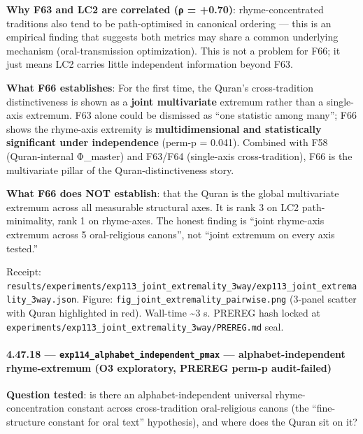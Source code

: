\documentclass[
]{article}
\begin{document}
\textbf{Why F63 and LC2 are correlated (ρ = +0.70)}: rhyme-concentrated
traditions also tend to be path-optimised in canonical ordering --- this
is an empirical finding that suggests both metrics may share a common
underlying mechanism (oral-transmission optimization). This is not a
problem for F66; it just means LC2 carries little independent
information beyond F63.

\textbf{What F66 establishes}: For the first time, the Quran's
cross-tradition distinctiveness is shown as a \textbf{joint
multivariate} extremum rather than a single-axis extremum. F63 alone
could be dismissed as ``one statistic among many''; F66 shows the
rhyme-axis extremity is \textbf{multidimensional and statistically
significant under independence} (perm-p = 0.041). Combined with F58
(Quran-internal Φ\_master) and F63/F64 (single-axis cross-tradition),
F66 is the multivariate pillar of the Quran-distinctiveness story.

\textbf{What F66 does NOT establish}: that the Quran is the global
multivariate extremum across all measurable structural axes. It is rank
3 on LC2 path-minimality, rank 1 on rhyme-axes. The honest finding is
``joint rhyme-axis extremum across 5 oral-religious canons'', not
``joint extremum on every axis tested.''

Receipt:
\texttt{results/experiments/exp113\_joint\_extremality\_3way/exp113\_joint\_extremality\_3way.json}.
Figure: \texttt{fig\_joint\_extremality\_pairwise.png} (3-panel scatter
with Quran highlighted in red). Wall-time \textasciitilde3 s. PREREG
hash locked at
\texttt{experiments/exp113\_joint\_extremality\_3way/PREREG.md} seal.

\paragraph{\texorpdfstring{4.47.18 ---
\texttt{exp114\_alphabet\_independent\_pmax} --- alphabet-independent
rhyme-extremum (O3 exploratory, PREREG perm-p
audit-failed)}{4.47.18 --- exp114\_alphabet\_independent\_pmax --- alphabet-independent rhyme-extremum (O3 exploratory, PREREG perm-p audit-failed)}}\label{exp114_alphabet_independent_pmax-alphabet-independent-rhyme-extremum-o3-exploratory-prereg-perm-p-audit-failed}

\textbf{Question tested}: is there an alphabet-independent universal
rhyme-concentration constant across cross-tradition oral-religious
canons (the ``fine-structure constant for oral text'' hypothesis), and
where does the Quran sit on it?
\end{document}
